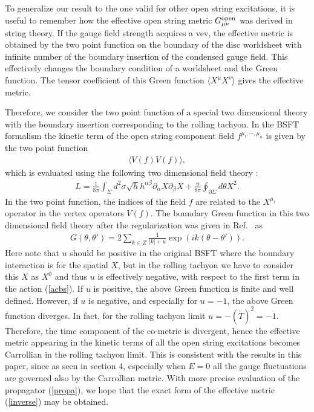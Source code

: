 \documentclass[a4paper,12pt]{article}
\begin{document}
To generalize our 
result to the one valid for other open string excitations, 
it is useful to remember  how the effective
open string metric $G^{\rm open}_{\mu\nu}$ was derived in string
theory. If the gauge field strength acquires a vev, the effective metric
is obtained by the two point function on the boundary of the disc
worldsheet with 
infinite number of the boundary insertion of the condensed gauge
field. This effectively changes the boundary condition of a worldsheet
and the Green function. The tensor coefficient of this 
Green function $\langle X^\mu X^\nu\rangle$ gives the effective metric.  

Therefore, we consider the two point function of a special 
two dimensional theory with the boundary insertion corresponding to the
rolling tachyon. In the BSFT formalism the kinetic term of the open
string component field  $f^{\mu_!, \cdots, \mu_n}$ is given by the two
point function 
\begin{eqnarray}
 \langle V(f) V(f) \rangle,
\end{eqnarray}
which is evaluated using the following 
two dimensional field theory \cite{BSFT}: 
\begin{eqnarray}
 L = \frac{1}{8\pi}
\int_\Sigma d^2 \sigma \sqrt{h} h^{\alpha\beta} \partial_\alpha X
\partial_\beta X + \frac{u}{8\pi}
\oint_{\partial \Sigma} d\theta X^2.
\label{acbs}
\end{eqnarray}
In the two point function, the indices of the field $f$ are related to
the $X^{\mu_i}$ operator in the vertex operators $V(f)$. The boundary 
Green function in this two dimensional field theory after the
regularization was given in Ref.\ \cite{BSFT} as 
\begin{eqnarray}
 G(\theta, \theta')= 2 \sum_{k\in Z} \frac{1}{|k|+u} 
\exp (ik(\theta-\theta')). 
\label{propa}
\end{eqnarray}
Here note that $u$ should be positive in the original BSFT where the
boundary interaction is for the spatial $X$, but in the rolling tachyon 
we have to consider this $X$ as $X^0$ and thus $u$ is 
effectively negative, with respect to the first term in the action
(\ref{acbs}). If $u$ is 
positive, the above Green function is finite and well defined. However, 
if $u$ is negative, and especially for $u=-1$, the above Green function
diverges. In fact, for the rolling tachyon limit $u=-(\dot{T})^2 = -1$.
Therefore, the time component of the co-metric is divergent, hence
the effective metric appearing in the kinetic terms of all the open 
string excitations becomes Carrollian in the rolling tachyon limit.
This is consistent with the results in this paper, since as seen 
in section 4, especially when $E=0$ all
the gauge fluctuations are governed also by the Carrollian metric.
With more precise evaluation of the propagator (\ref{propa}), we hope
that the exact form of the effective metric (\ref{inverse}) may be
obtained.  
\end{document}
